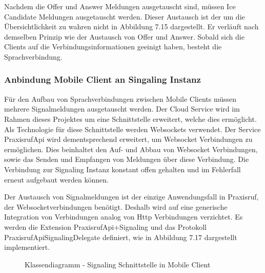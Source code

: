 Nachdem die Offer und Answer Meldungen ausgetauscht sind, müssen Ice Candidate Meldungen ausgetauscht werden.
Dieser Austausch ist der um die Übersichtlichkeit zu wahren nicht in Abbildung 7.15 dargestellt.
Er verläuft nach demselben Prinzip wie der Austausch von Offer und Answer.
Sobald sich die Clients auf die Verbindungsinformationen geeinigt haben, besteht die Sprachverbindung.

\clearpage

\subsubsection{Anbindung Mobile Client an Singaling Instanz}

Für den Aufbau von Sprachverbindungen zwischen Mobile Clients müssen mehrere Signalmeldungen ausgetauscht werden.
Der Cloud Service wird im Rahmen dieses Projektes um eine Schnittstelle erweitert, welche dies ermöglicht.
Als Technologie für diese Schnittstelle werden Websockets verwendet.
Der Service PraxisrufApi wird dementsprechend erweitert, um Websocket Verbindungen zu ermöglichen.
Dies beinhaltet den Auf- und Abbau von Websocket Verbindungen, sowie das Senden und Empfangen von Meldungen über diese Verbindung.
Die Verbindung zur Signaling Instanz konstant offen gehalten und im Fehlerfall erneut aufgebaut werden können.

Der Austausch von Signalmeldungen ist der einzige Anwendungsfall in Praxisruf, der Websocketverbindungen benötigt.
Deshalb wird auf eine generische Integration von Verbindungen analog von Http Verbindungen verzichtet.
Es werden die Extension PraxisrufApi+Signaling und das Protokoll PraxisrufApiSignalingDelegate definiert, wie in Abbildung 7.17 dargestellt implementiert.

\begin{figure}[h]
    \centering
    \begin{minipage}[b]{0.9\textwidth}
        \caption{Klassendiagramm - Signaling Schnittstelle in Mobile Client}
    \end{minipage}
\end{figure}

